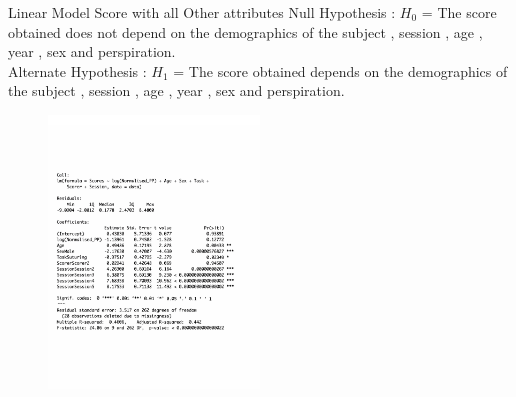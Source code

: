 \documentclass{beamer}
\begin{document}
\begin{frame}{Linear Model}{ Score with all Other attributes}
Null Hypothesis : $H_0$ =  The score obtained does not depend on the demographics of the subject , session , age , year , sex and perspiration.\\
Alternate Hypothesis : $H_1$ =  The score obtained  depends on the demographics of the subject , session , age , year , sex and perspiration.\\
\begin{figure}
	\centering
	\includegraphics[width=0.5\textwidth]{ScoreSummary.pdf}
	\centering
\end{figure}
 \end{frame}
\end{document}
